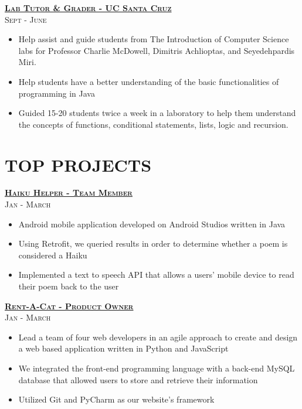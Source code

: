 \documentclass{tccv}
\begin{document}
\begin{multicols}{2}
\bigskip\medskip

{\raggedleft\large\textsc\underline{\textbf{Lab Tutor \& Grader - UC Santa Cruz}}}\\
{\raggedleft\footnotesize\textsc{Sept   - June }}
\begin{itemize}[wide=0pt]
\item Help assist and guide students from The Introduction of Computer Science labs for Professor Charlie McDowell, Dimitris Achlioptas, and Seyedehpardis Miri. 
\item Help students have a better understanding of the basic functionalities of programming in Java
\item Guided 15-20 students twice a week in a laboratory to help them understand the concepts of functions, conditional statements, lists, logic and recursion.
\end{itemize}

\columnbreak 

\section{TOP PROJECTS}

{\raggedleft\large\textsc\underline{\textbf{Haiku Helper - Team Member}}}\\
{\raggedleft\footnotesize\textsc{Jan   - March }}
\begin{itemize}[wide=0pt]
\item {Android mobile application developed on Android Studios written in Java}
\item {Using Retrofit, we queried results in order to determine whether a poem is considered a Haiku}
\item {Implemented a text to speech API that allows a users' mobile device to read their poem back to the user}
\end{itemize}

{\raggedleft\large\textsc\underline{\textbf{Rent-A-Cat - Product Owner}}}\\
{\raggedleft\footnotesize\textsc{Jan   - March }}
\begin{itemize}[wide=0pt]
\item {Lead a team of four web developers in an agile approach to create and design a web based application written in Python and JavaScript}
\item {We integrated the front-end programming language with a back-end MySQL database that allowed users to store and retrieve their information}
\item {Utilized Git and PyCharm as our website's framework}
\end{itemize}



\end{multicols}
\end{document}
